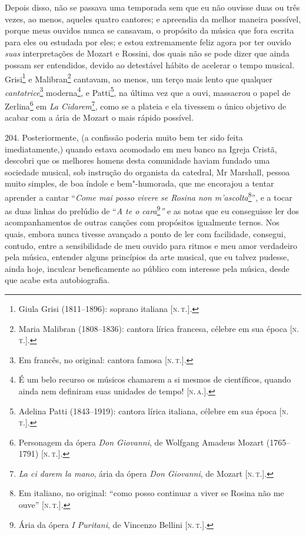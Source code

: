 Depois disso, não se passava uma temporada sem que eu não ouvisse duas
ou três vezes, ao menos, aqueles quatro cantores; e apreendia da melhor
maneira possível, porque meus ouvidos nunca se cansavam, o propósito da
música que fora escrita para eles ou estudada por eles; e estou
extremamente feliz agora por ter ouvido \emph{suas} interpretações de
Mozart e Rossini, dos quais não se pode dizer que ainda possam ser
entendidos, devido ao detestável hábito de acelerar o tempo musical.
Grisi\footnote{Giula Grisi (1811--1896): soprano italiana {[}\textsc{n.\,t.}{]}.}
e Malibran\footnote{Maria Malibran (1808--1836): cantora lírica francesa,
  célebre em sua época {[}\textsc{n.\,t.}{]}.} cantavam, ao menos, um terço
mais lento que qualquer \emph{cantatrice}\footnote{Em francês, no
  original: cantora famosa {[}\textsc{n.\,t.}{]}.} moderna\footnote{É um belo
  recurso os músicos chamarem a si mesmos de científicos, quando ainda
  nem definiram suas unidades de tempo! {[}\textsc{n.\,a.}{]}.}, e
Patti\footnote{Adelina Patti (1843--1919): cantora lírica italiana,
  célebre em sua época {[}\textsc{n.\,t.}{]}.}, na última vez que a ouvi,
massacrou o papel de Zerlina\footnote{Personagem da ópera \emph{Don
  Giovanni}, de Wolfgang Amadeus Mozart (1765--1791) {[}\textsc{n.\,t.}{]}.} em
\emph{La Cidarem}\footnote{\emph{La ci darem la mano}, ária da ópera
  \emph{Don Giovanni}, de Mozart {[}\textsc{n.\,t.}{]}.}, como se a plateia e
ela tivessem o único objetivo de acabar com a ária de Mozart o mais
rápido possível.

204. Posteriormente, (a confissão poderia muito bem ter sido feita
imediatamente,) quando estava acomodado em meu banco na Igreja Cristã,
descobri que os melhores homens desta comunidade haviam fundado uma
sociedade musical, sob instrução do organista da catedral, Mr Marshall,
pessoa muito simples, de boa índole e bem"-humorada, que me encorajou a
tentar aprender a cantar ``\emph{Come mai posso vivere} \emph{se Rosina
non m'ascolta}\footnote{Em italiano, no original: ``como posso continuar
  a viver se Rosina não me ouve'' {[}\textsc{n.\,t.}{]}.}'', e a tocar as duas
linhas do prelúdio de ``\emph{A te o cara}\footnote{Ária da ópera
  \emph{I Puritani}, de Vincenzo Bellini {[}\textsc{n.\,t.}{]}.}\emph{''} e as
notas que eu conseguisse ler dos acompanhamentos de outras canções com
propósitos igualmente ternos. Nos quais, embora nunca tivesse avançado a
ponto de ler com facilidade, consegui, contudo, entre a sensibilidade de
meu ouvido para ritmos e meu amor verdadeiro pela música, entender
alguns princípios da arte musical, que eu talvez pudesse, ainda hoje,
inculcar beneficamente ao público com interesse pela música, desde que
acabe esta autobiografia.

